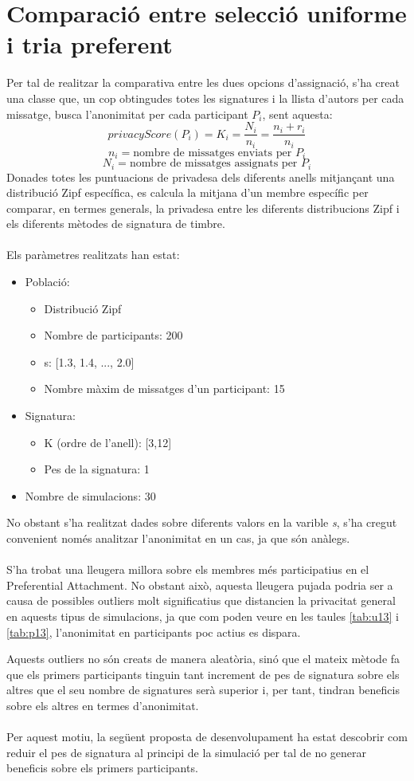 \documentclass{article}
\begin{document}
\section{Comparació entre selecció uniforme i tria preferent}
Per tal de realitzar la comparativa entre les dues opcions d'assignació, s'ha creat una classe que, un cop obtingudes totes les signatures i la llista d'autors per cada missatge, busca l'anonimitat per cada participant $P_i$, sent aquesta:
\[privacyScore(P_i)=K_i= \frac{N_i}{n_i} = \frac{n_i + r_i}{n_i}\]
\[n_i = {\textrm{nombre de missatges enviats per } P_i} \]
\[N_i = {\textrm{nombre de missatges assignats per } P_i}\]
Donades totes les puntuacions de privadesa dels diferents anells mitjançant una distribució Zipf específica, es calcula la mitjana d’un membre específic per comparar, en termes generals, la privadesa entre les diferents distribucions Zipf i els diferents mètodes de signatura de timbre.
\\
\\
Els paràmetres realitzats han estat:
\begin{itemize}
	\item Població:
	\begin{itemize}
		\item Distribució Zipf
		\item Nombre de participants: 200
		\item s: [1.3, 1.4, ..., 2.0]
		\item Nombre màxim de missatges d'un participant: 15
	\end{itemize}
	\item Signatura:
	\begin{itemize}
		\item K (ordre de l'anell): [3,12]
		\item Pes de la signatura: 1
	\end{itemize}
	\item Nombre de simulacions: 30
\end{itemize}
No obstant s'ha realitzat dades sobre diferents valors en la varible \textit{s}, s'ha cregut convenient només analitzar l'anonimitat en un cas, ja que són anàlegs.
\\
\\
S'ha trobat una lleugera millora sobre els membres més participatius en el Preferential Attachment. No obstant això, aquesta lleugera pujada podria ser a causa de possibles outliers molt significatius que distancien la privacitat general en aquests tipus de simulacions, ja que com poden veure en les taules \ref{tab:u13} i \ref{tab:p13}, l'anonimitat en participants poc actius es dispara.


Aquests outliers no són creats de manera aleatòria, sinó que el mateix mètode fa que els primers participants tinguin tant increment de pes de signatura sobre els altres que el seu nombre de signatures serà superior i, per tant, tindran beneficis sobre els altres en termes d'anonimitat.
\\\\
Per aquest motiu, la següent proposta de desenvolupament ha estat descobrir com reduir el pes de signatura al principi de la simulació per tal de no generar beneficis sobre els primers participants.
\end{document}
